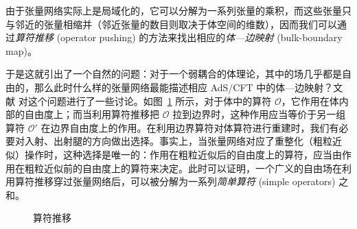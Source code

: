 由于张量网络实际上是局域化的，它可以分解为一系列张量的乘积，而这些张量只与邻近的张量相缩并（邻近张量的数目则取决于体空间的维数），因而我们可以通过\emph{算符推移} (operator pushing) 的方法来找出相应的\emph{体—边映射} (bulk-boundary map)\cite{pastawski2015holographic,bhattacharyya2016exploring,bhattacharyya2018tensor}。

于是这就引出了一个自然的问题：对于一个弱耦合的体理论，其中的场几乎都是自由的，那么此时什么样的张量网络最能描述相应 AdS/CFT 中的体—边映射？文献 \parencite{bhattacharyya2018tensor} 对这个问题进行了一些讨论。如图~\ref{fig:operator-pushing} 所示，对于体中的算符 $\mathcal{O}$，它作用在体内部的自由度上；而当利用算符推移把 $\mathcal{O}$ 拉到边界时，这种作用应当等价于另一组算符 $\mathcal{O}'$ 在边界自由度上的作用。在利用边界算符对体算符进行重建时，我们有必要对入射、出射腿的方向做出选择。事实上，当张量网络对应了重整化（粗粒近似）操作时，这种选择是唯一的：作用在粗粒近似后的自由度上的算符，应当由作用在粗粒近似前的自由度上的算符来决定。此时可以证明，一个广义的自由场在利用算符推移穿过张量网络后，可以被分解为一系列\emph{简单算符} (simple operators) 之和\cite{bhattacharyya2018tensor}。

\begin{figure}[htb]
  \centering
  \caption{算符推移}
  \label{fig:operator-pushing}
\end{figure}


